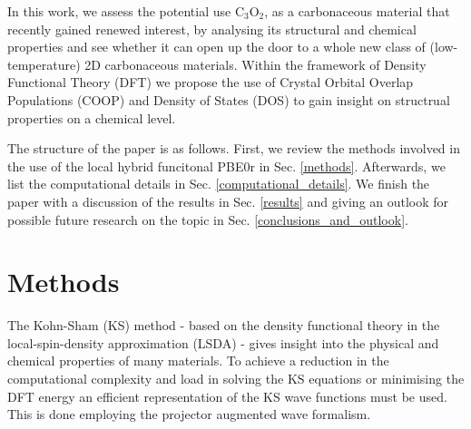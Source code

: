 \documentclass[%
 reprint,
nofootinbib,
 amsmath,amssymb,
 aps,
]{revtex4-2}
\begin{document}
In this work, we assess the potential use C$_3$O$_2$, as a carbonaceous material that recently gained renewed interest, by analysing its structural and chemical properties and see whether it can open up the door to a whole new class of (low-temperature) 2D carbonaceous materials. Within the framework of Density Functional Theory (DFT) we propose the use of Crystal Orbital Overlap Populations (COOP) and Density of States (DOS) to gain insight on structrual properties on a chemical level. 

The structure of the paper is as follows. First, we review the methods involved in the use of the local hybrid funcitonal PBE0r in Sec. \ref{methods}. Afterwards, we list the computational details in Sec. \ref{computational_details}. We finish the paper with a discussion of the results in Sec. \ref{results} and giving an outlook for possible future research on the topic in Sec. \ref{conclusions_and_outlook}.


\section{\label{methods}Methods}
The Kohn-Sham (KS) method - based on the density functional theory in the local-spin-density approximation (LSDA) - gives insight into the physical and chemical properties\cite{Grechnev_2003} of many materials. To achieve a reduction in the computational complexity and load in solving the KS equations or minimising the DFT energy an efficient representation of the KS wave functions must be used. This is done employing the projector augmented wave formalism\cite{Bloechl1994}. 
\end{document}
